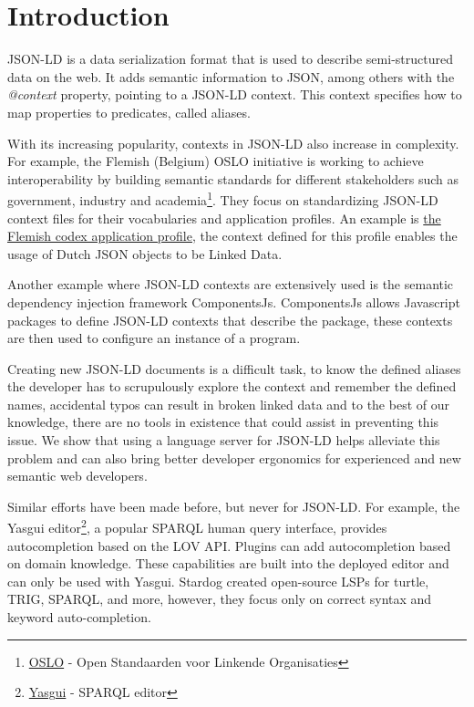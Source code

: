 \documentclass[
]{ceurart}
\begin{document}
\maketitle

\section{Introduction}

JSON-LD is a data serialization format that is used to describe semi-structured data on the web\cite{JSON-LD-W3C}.
It adds semantic information to JSON, among others with the \textit{@context} property, pointing to a JSON-LD context.
This context specifies how to map properties to predicates, called aliases.

With its increasing popularity, contexts in JSON-LD also increase in complexity.
For example, the Flemish (Belgium) OSLO initiative is working to achieve interoperability by building semantic standards for different stakeholders such as government, industry and academia\footnote{\href{https://www.vlaanderen.be/digitaal-vlaanderen/onze-oplossingen/oslo}{OSLO} - Open Standaarden voor Linkende Organisaties}.
They focus on standardizing JSON-LD context files for their vocabularies and application profiles. 
An example is \href{https://data.vlaanderen.be/doc/applicatieprofiel/vlaamse-codex/}{the Flemish codex application profile}, the context defined for this profile enables the usage of Dutch JSON objects to be Linked Data.

Another example where JSON-LD contexts are extensively used is the semantic dependency injection framework ComponentsJs\cite{CJS}. 
ComponentsJs allows Javascript packages to define JSON-LD contexts that describe the package, these contexts are then used to configure an instance of a program.

Creating new JSON-LD documents is a difficult task, to know the defined aliases the developer has to scrupulously explore the context and remember the defined names, 
accidental typos can result in broken linked data and to the best of our knowledge, there are no tools in existence that could assist in preventing this issue.
We show that using a language server for JSON-LD helps alleviate this problem and can also bring better developer ergonomics for experienced and new semantic web developers.

Similar efforts have been made before, but never for JSON-LD. 
For example, the Yasgui editor\footnote{\href{https://triply.cc/docs/yasgui/}{Yasgui} - SPARQL editor}, a popular SPARQL human query interface, provides autocompletion based on the LOV API\cite{LOV}. 
Plugins can add autocompletion based on domain knowledge. 
These capabilities are built into the deployed editor and can only be used with Yasgui.
Stardog created open-source LSPs for turtle, TRIG, SPARQL, and more, however, they focus only on correct syntax and keyword auto-completion\cite{stardog}. 
\end{document}
